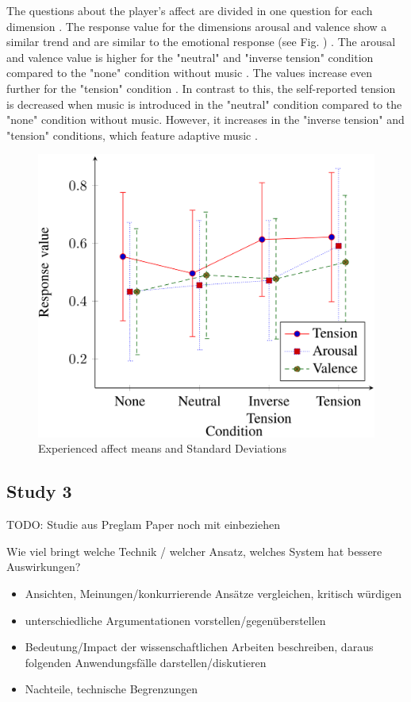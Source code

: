 The questions about the player's affect are divided in one question for each dimension \cite{plut2019music}.
The response value for the dimensions arousal and valence show a similar trend and are similar to the emotional response (see Fig. ) \cite{plut2019music}. The arousal and valence value is higher for the "neutral" and "inverse tension" condition compared to the "none" condition without music \cite{plut2019music}. The values increase even further for the "tension" condition \cite{plut2019music}.
In contrast to this, the self-reported tension is decreased when music is introduced in the "neutral" condition compared to the "none" condition without music. However, it increases in the "inverse tension" and "tension" conditions, which feature adaptive music \cite{plut2019music}.
\begin{figure}
    \centering
    \includegraphics[width=1\linewidth]{images/music_matters_experienced_affect.png}
    \caption{Experienced affect means and Standard Deviations \cite{plut2019music}}
    \label{fig:music_matters_experienced_affect}
\end{figure}

\subsection{Study 3}
TODO: Studie aus Preglam Paper noch mit einbeziehen

Wie viel bringt welche Technik / welcher Ansatz, welches System
hat bessere Auswirkungen?

\begin{itemize}
    \item Ansichten, Meinungen/konkurrierende Ansätze vergleichen, kritisch würdigen
    \item unterschiedliche Argumentationen vorstellen/gegenüberstellen
    \item Bedeutung/Impact der wissenschaftlichen Arbeiten beschreiben, daraus folgenden Anwendungsfälle darstellen/diskutieren
    \item Nachteile, technische Begrenzungen

\end{itemize}